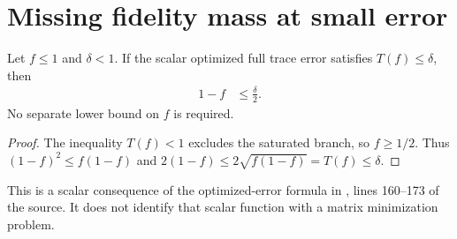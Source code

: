 \section{Missing fidelity mass at small error}
\label{sec:optimized_pure_error_mass}

\begin{theorem}
  \label{thm:optimized_pure_error_mass}
  \leanok
  Let $f\le1$ and $\delta<1$. If the scalar optimized full trace error
  satisfies $T(f)\le\delta$, then
  \begin{align}
    \label{eq:optimized_pure_error_mass}
    1-f&\le\frac{\delta}{2}.
  \end{align}
  No separate lower bound on $f$ is required.
\end{theorem}
\begin{proof}\leanok
  The inequality $T(f)<1$ excludes the saturated branch, so $f\ge1/2$.
  Thus $(1-f)^2\le f(1-f)$ and
  $2(1-f)\le2\sqrt{f(1-f)}=T(f)\le\delta$.
\end{proof}

This is a scalar consequence of the optimized-error formula in
\cite{Schuch2008EntropyScaling}, lines 160--173 of the source.
It does not identify that scalar function with a matrix minimization problem.
